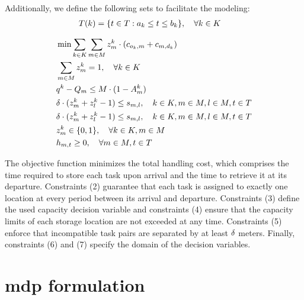 \documentclass[a4paper,twoside,11pt]{article}
\begin{document}
Additionally, we define the following sets to facilitate the modeling:
\begin{align*}
T(k) &= \{t \in T : a_k \leq t \leq b_k\}, \quad \forall k \in K
\end{align*}

        
\setcounter{equation}{0}
\begin{align}
&\min \sum_{k \in K} \sum_{m \in M}z^k_m \cdot (c_{o_k,m} + c_{m,d_k})\\
&\sum_{m\in M}z^k_{m}=1,\quad \forall k \in K\\
& q^k - Q_m \leq M \cdot (1 - A^k_m)\\
&\delta\cdot(z^k_{m}+z^k_{l}-1) \leq s_{m,l},\quad k\in K,m \in M,l\in M,t\in T \\
&\delta\cdot(z^k_{m}+z^k_{l}-1) \leq s_{m,l},\quad k\in K,m \in M,l\in M,t\in T \\
&z^k_{m} \in \{0,1\}, \quad \forall k \in K, m \in M \\
&h_{m,t} \geq 0, \quad \forall m \in M, t \in T
\end{align}

The objective function minimizes the total handling cost, which comprises the time required to store each task upon arrival and the time to retrieve it at its departure. Constraints (2) guarantee that each task is assigned to exactly one location at every period between its arrival and departure. Constraints (3) define the used capacity decision variable and constraints (4) ensure that the capacity limits of each storage location are not exceeded at any time. Constraints (5) enforce that incompatible task pairs are separated by at least $\delta$ meters. Finally, constraints (6) and (7) specify the domain of the decision variables.

\section{\gls{mdp} formulation}
\end{document}
